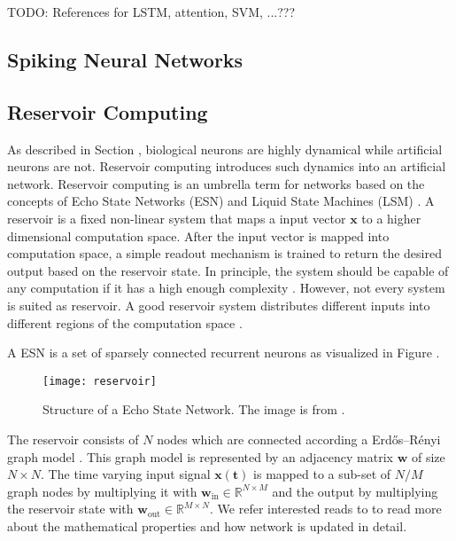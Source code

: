 TODO: References for LSTM, attention, SVM, ...???


\subsection{Spiking Neural Networks}





\subsection{Reservoir Computing}
As described in Section , biological neurons are highly dynamical while artificial neurons are not.
Reservoir computing introduces such dynamics into an artificial network.
Reservoir computing is an umbrella term for networks based on the concepts of Echo State Networks (ESN)  and Liquid State Machines (LSM) .
A reservoir is a fixed non-linear system that maps a input vector \(\boldsymbol{x}\) to a higher dimensional computation space.
After the input vector is mapped into computation space, a simple readout mechanism is trained to return the desired output based on the reservoir state.
In principle, the system should be capable of any computation if it has a high enough complexity .
However, not every system is suited as reservoir.
A good reservoir system distributes different inputs into different regions of the computation space \cite{Konkoli_2018}.

A ESN is a set of sparsely connected recurrent neurons as visualized in Figure .

\begin{figure}[h]
    \centering
    \texttt{[image: reservoir]}
    \caption[Structure of a Echo State Network]{Structure of a Echo State Network. The image is from .}
\end{figure}

The reservoir consists of \(N\) nodes which are connected according a Erdős–Rényi graph model .
This graph model is represented by an adjacency matrix \(\boldsymbol{w}\) of size \(N \times N\).
The time varying input signal \(\boldsymbol{x(t)}\) is mapped to a sub-set of \(N/M\) graph nodes by multiplying it with \(\boldsymbol{w}_{\text{in}} \in \mathbb{R}^{N\times M}\) and the output by multiplying the reservoir state with \(\boldsymbol{w}_{\text{out}} \in \mathbb{R}^{M\times N}\).
We refer interested reads to  to read more about the mathematical properties and how network is updated in detail.

